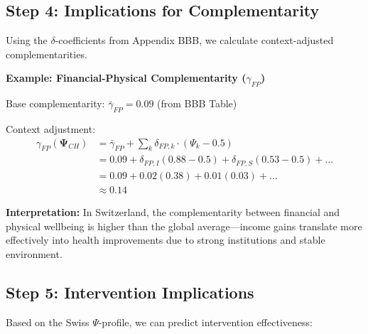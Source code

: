 \subsection{Step 4: Implications for Complementarity}

Using the $\delta$-coefficients from Appendix BBB, we calculate context-adjusted 
complementarities.

\textbf{Example: Financial-Physical Complementarity ($\gamma_{FP}$)}

Base complementarity: $\bar{\gamma}_{FP} = 0.09$ (from BBB Table)

Context adjustment:
\begin{align*}
\gamma_{FP}(\boldsymbol{\Psi}_{CH}) &= \bar{\gamma}_{FP} + \sum_k \delta_{FP,k} \cdot (\Psi_k - 0.5) \\
&= 0.09 + \delta_{FP,I}(0.88-0.5) + \delta_{FP,S}(0.53-0.5) + \ldots \\
&= 0.09 + 0.02(0.38) + 0.01(0.03) + \ldots \\
&\approx 0.14
\end{align*}

\textbf{Interpretation:} In Switzerland, the complementarity between financial 
and physical wellbeing is higher than the global average---income gains 
translate more effectively into health improvements due to strong institutions 
and stable environment.

\subsection{Step 5: Intervention Implications}

Based on the Swiss $\Psi$-profile, we can predict intervention effectiveness:

